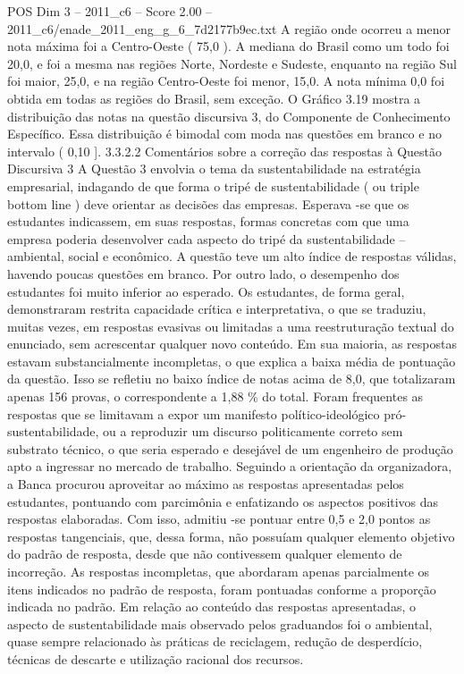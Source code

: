\begin{textsample}{POS Dim 3 – 2011\_c6 – Score 2.00 – 2011\_c6/enade\_2011\_eng\_g\_6\_7d2177b9ec.txt}
A região onde ocorreu a menor nota máxima foi a Centro-Oeste ( 75,0 ).
A mediana do Brasil como um todo foi 20,0, e foi a mesma nas regiões Norte, Nordeste e Sudeste, enquanto na região Sul foi maior, 25,0, e na região Centro-Oeste foi menor, 15,0.
A nota mínima 0,0 foi obtida em todas as regiões do Brasil, sem exceção.
O Gráfico 3.19 mostra a distribuição das notas na questão discursiva 3, do Componente de Conhecimento Específico.
Essa distribuição é bimodal com moda nas questões em branco e no intervalo ( 0,10 ]. 3.3.2.2 Comentários sobre a correção das respostas à Questão Discursiva 3 A Questão 3 envolvia o tema da sustentabilidade na estratégia empresarial, indagando de que forma o tripé de sustentabilidade ( ou triple bottom line ) deve orientar as decisões das empresas.
Esperava -se que os estudantes indicassem, em suas respostas, formas concretas com que uma empresa poderia desenvolver cada aspecto do tripé da sustentabilidade – ambiental, social e econômico.
A questão teve um alto índice de respostas válidas, havendo poucas questões em branco.
Por outro lado, o desempenho dos estudantes foi muito inferior ao esperado.
Os estudantes, de forma geral, demonstraram restrita capacidade crítica e interpretativa, o que se traduziu, muitas vezes, em respostas evasivas ou limitadas a uma reestruturação textual do enunciado, sem acrescentar qualquer novo conteúdo.
Em sua maioria, as respostas estavam substancialmente incompletas, o que explica a baixa média de pontuação da questão.
Isso se refletiu no baixo índice de notas acima de 8,0, que totalizaram apenas 156 provas, o correspondente a 1,88 \% do total.
Foram frequentes as respostas que se limitavam a expor um manifesto político-ideológico pró-sustentabilidade, ou a reproduzir um discurso politicamente correto sem substrato técnico, o que seria esperado e desejável de um engenheiro de produção apto a ingressar no mercado de trabalho.
Seguindo a orientação da organizadora, a Banca procurou aproveitar ao máximo as respostas apresentadas pelos estudantes, pontuando com parcimônia e enfatizando os aspectos positivos das respostas elaboradas.
Com isso, admitiu -se pontuar entre 0,5 e 2,0 pontos as respostas tangenciais, que, dessa forma, não possuíam qualquer elemento objetivo do padrão de resposta, desde que não contivessem qualquer elemento de incorreção.
As respostas incompletas, que abordaram apenas parcialmente os itens indicados no padrão de resposta, foram pontuadas conforme a proporção indicada no padrão.
Em relação ao conteúdo das respostas apresentadas, o aspecto de sustentabilidade mais observado pelos graduandos foi o ambiental, quase sempre relacionado às práticas de reciclagem, redução de desperdício, técnicas de descarte e utilização racional dos recursos.

\end{textsample}
